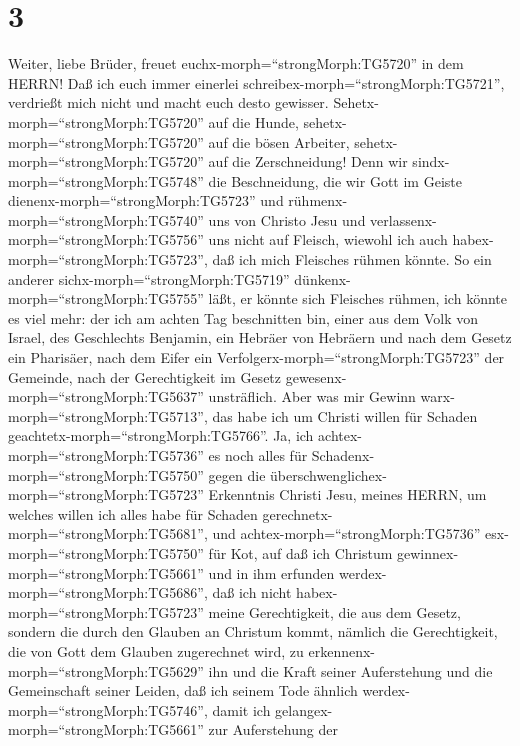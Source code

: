 \hypertarget{section-2}{%
\section{3}\label{section-2}}

 Weiter, liebe Brüder, freuet
euchx-morph=``strongMorph:TG5720'' in dem HERRN! Daß ich euch immer
einerlei schreibex-morph=``strongMorph:TG5721'', verdrießt mich nicht
und macht euch desto gewisser. 
Sehetx-morph=``strongMorph:TG5720'' auf die Hunde,
sehetx-morph=``strongMorph:TG5720'' auf die bösen Arbeiter,
sehetx-morph=``strongMorph:TG5720'' auf die Zerschneidung! 
Denn wir sindx-morph=``strongMorph:TG5748'' die Beschneidung, die wir
Gott im Geiste dienenx-morph=``strongMorph:TG5723'' und
rühmenx-morph=``strongMorph:TG5740'' uns von Christo Jesu und
verlassenx-morph=``strongMorph:TG5756'' uns nicht auf Fleisch,
 wiewohl ich auch habex-morph=``strongMorph:TG5723'', daß
ich mich Fleisches rühmen könnte. So ein anderer
sichx-morph=``strongMorph:TG5719'' dünkenx-morph=``strongMorph:TG5755''
läßt, er könnte sich Fleisches rühmen, ich könnte es viel mehr:
 der ich am achten Tag beschnitten bin, einer aus dem Volk
von Israel, des Geschlechts Benjamin, ein Hebräer von Hebräern und nach
dem Gesetz ein Pharisäer,  nach dem Eifer ein
Verfolgerx-morph=``strongMorph:TG5723'' der Gemeinde, nach der
Gerechtigkeit im Gesetz gewesenx-morph=``strongMorph:TG5637''
unsträflich.  Aber was mir Gewinn
warx-morph=``strongMorph:TG5713'', das habe ich um Christi willen für
Schaden geachtetx-morph=``strongMorph:TG5766''.  Ja, ich
achtex-morph=``strongMorph:TG5736'' es noch alles für
Schadenx-morph=``strongMorph:TG5750'' gegen die
überschwenglichex-morph=``strongMorph:TG5723'' Erkenntnis Christi Jesu,
meines HERRN, um welches willen ich alles habe für Schaden
gerechnetx-morph=``strongMorph:TG5681'', und
achtex-morph=``strongMorph:TG5736'' esx-morph=``strongMorph:TG5750'' für
Kot, auf daß ich Christum gewinnex-morph=``strongMorph:TG5661''
 und in ihm erfunden werdex-morph=``strongMorph:TG5686'',
daß ich nicht habex-morph=``strongMorph:TG5723'' meine Gerechtigkeit,
die aus dem Gesetz, sondern die durch den Glauben an Christum kommt,
nämlich die Gerechtigkeit, die von Gott dem Glauben zugerechnet wird,
 zu erkennenx-morph=``strongMorph:TG5629'' ihn und die
Kraft seiner Auferstehung und die Gemeinschaft seiner Leiden, daß ich
seinem Tode ähnlich werdex-morph=``strongMorph:TG5746'', 
damit ich gelangex-morph=``strongMorph:TG5661'' zur Auferstehung der
